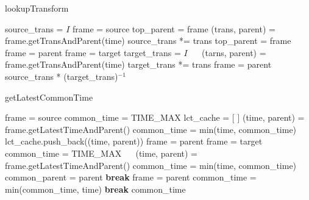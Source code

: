 \documentclass[a4paper]{jreport}	%
\begin{document}
\begin{algorithm}
\caption{lookupTransform} \label{algo:lookupTransform}
\begin{algorithmic}[1]
	 
	 
	 \label{code:getLatest}
	\EndIf
	\State source\_trans = $I$ 
	\State frame = source
	\State top\_parent = frame
	  \label{code:lookupTrans-s-r}
	\State (trans, parent) = frame.getTransAndParent(time) 
	\State source\_trans *= trans 
	\State top\_parent = frame
	\State frame = parent
	\EndWhile \label{code:lookupTrans-s-r2}
	\State frame = target
	\State target\_trans = $I$
	　 \label{code:lookupTrans-t-r}
	\State (tarns, parent) = frame.getTransAndParent(time)
	\State target\_trans *= trans
	\State frame = parent
	\EndWhile \label{code:lookupTrans-t-r2}
	\State \Return source\_trans * (target\_trans)$^{-1}$ 
	\EndFunction
\end{algorithmic}
\end{algorithm}


\begin{algorithm}
\caption{getLatestCommonTime}
\begin{algorithmic}[1]
	 
	\State frame = source
	\State common\_time = TIME\_MAX
	\State lct\_cache = [ ] 
	  \label{code:getLatest-s-r}
	\State (time, parent) = frame.getLatestTimeAndParent()
	\State common\_time = min(time, common\_time)
	\State lct\_cache.push\_back((time, parent))
	\State frame = parent
	\EndWhile \label{code:getLatest-s-r2}
	\State frame = target
	\State common\_time = TIME\_MAX
	　 \label{code:getLatest-t-r}
	\State (time, parent) = frame.getLatestTimeAndParent()
	\State common\_time = min(time, common\_time)
	\State common\_parent = parent
	\State \textbf{break}
	\EndIf
	\State frame = parent
	\EndWhile \label{code:getLatest-t-r2}
	  \label{code:getLatest-min}
	\State common\_time = min(common\_time, time)
	\State \textbf{break}
	\EndIf
	\EndFor \label{code:getLatest-min2}
	\State \Return common\_time
	\EndFunction
\end{algorithmic}
\end{algorithm}
\end{document}
